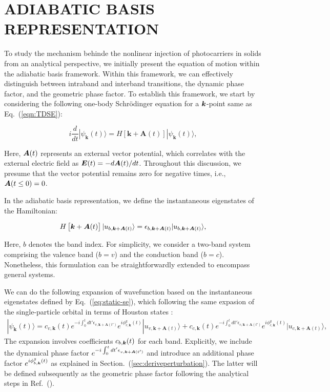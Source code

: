 \chapter{ADIABATIC BASIS REPRESENTATION \label{ch:A_ADIABATIC}}
\label{ch:Adiabatic}
To study the mechanism behinde the nonlinear injection of photocarriers in solids from an analytical perspective, we initially present the equation of motion within the adiabatic basis framework. Within this framework, we can effectively distinguish between intraband and interband transitions, the dynamic phase factor, and the geometric phase factor. To establish this framework, we start by considering the following one-body Schrödinger equation for a $\boldsymbol k$-point same as Eq.~(\ref{eqn:TDSE}):

\begin{equation}
	i \frac{d}{dt} | \psi_{\mathbf k}(t) \rangle = H \left [\mathbf k + \mathbf A(t) \right ] | \psi_{\mathbf k}(t) \rangle,
	\label{eqn:tdse00}
\end{equation}

Here, $\boldsymbol A(t)$ represents an external vector potential, which correlates with the external electric field as $\boldsymbol E(t)=-d\boldsymbol A(t)/dt$. Throughout this discussion, we presume that the vector potential remains zero for negative times, i.e., $\boldsymbol A(t\leq 0)=0$.

In the adiabatic basis representation, we define the instantaneous eigenstates of the Hamiltonian:

\begin{align}
	H\left [\boldsymbol k + \boldsymbol A(t) \right ] |u_{b,\boldsymbol k+\boldsymbol A(t)}\rangle = \epsilon_{b,\boldsymbol k + \boldsymbol A(t)}|u_{b,\boldsymbol k+\boldsymbol A(t)}\rangle,
	\label{eq:static-se}
\end{align}

Here, $b$ denotes the band index. For simplicity, we consider a two-band system comprising the valence band ($b=v$) and the conduction band ($b=c$). Nonetheless, this formulation can be straightforwardly extended to encompass general systems.

We can do the following expansion of wavefunction based on the instantaneous eigenstates defined by Eq.~(\ref{eq:static-se}), which following the same expasion of the single-particle orbital in terms of Houston states \cite{PhysRev.57.184, PhysRevB.33.5494, hirori2024high}:
\begin{align}
	|\psi_{\mathbf k}(t)\rangle = c_{v,\mathbf k}(t) e^{-i\int^t_0dt' \epsilon_{v,\mathbf k+ \mathbf A(t')}} e^{i\phi^g_{v,\mathbf k}(t)} |u_{v,\mathbf k+\mathbf A(t)}\rangle
	+c_{c,\mathbf k}(t) e^{-i\int^t_0dt' \epsilon_{c,\mathbf k+ \mathbf A(t')}} e^{i\phi^g_{c,\mathbf k}(t)} |u_{c,\mathbf k+\mathbf A(t)}\rangle,
	\label{eq:ansatz}
\end{align}
The expansion involves coefficients $c_{b,\boldsymbol k}(t)$ for each band. Explicitly, we include the dynamical phase factor $e^{-i\int^t_0dt' \epsilon_{v,\boldsymbol k+ \boldsymbol A(t')}}$ and introduce an additional phase factor $e^{i\phi^g_{b,\boldsymbol k}(t)}$ as explained in Section.~(\ref{sec:deriveperturbation}). The latter will be defined subsequently as the geometric phase factor following the analytical steps in Ref.~(\cite{hirori2024high}).

